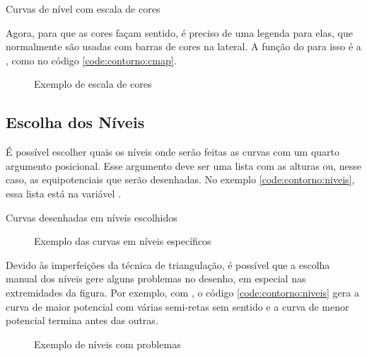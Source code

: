     \begin{listing}[H]
        \caption{Curvas de nível com escala de cores}
        \label{code:contorno:cmap}

    \end{listing}

    Agora, para que as cores façam sentido, é preciso de uma legenda para elas, que normalmente são usadas com barras de cores na lateral. A função do \pyplot para isso é a , como no código \ref{code:contorno:cmap}.

    \begin{figure}[H]
        \centering
        

        \caption{Exemplo de escala de cores}
        \label{fig:contorno:cmap}
    \end{figure}


\subsection{Escolha dos Níveis}

    É possível escolher quais os níveis onde serão feitas as curvas com um quarto argumento posicional. Esse argumento deve ser uma lista com as alturas ou, nesse caso, as equipotenciais que serão desenhadas. No exemplo \ref{code:contorno:niveis}, essa lista está na variável .

    \begin{listing}[H]
        \caption{Curvas desenhadas em níveis escolhidos}
        \label{code:contorno:niveis}

    \end{listing}

    \begin{figure}[H]
        \centering
        

        \caption{Exemplo das curvas em níveis específicos}
        \label{fig:contorno:niveis}
    \end{figure}

    \begin{nota}
        Devido às imperfeições da técnica de triangulação, é possível que a escolha manual dos níveis gere alguns problemas no desenho, em especial nas extremidades da figura. Por exemplo, com , o código \ref{code:contorno:niveis} gera a curva de maior potencial com várias semi-retas sem sentido e a curva de menor potencial termina antes das outras.

        \begin{figure}[H]
            \centering
            

            \caption{Exemplo de níveis com problemas}
            \label{fig:contorno:niveis:problema}
        \end{figure}
    \end{nota}


